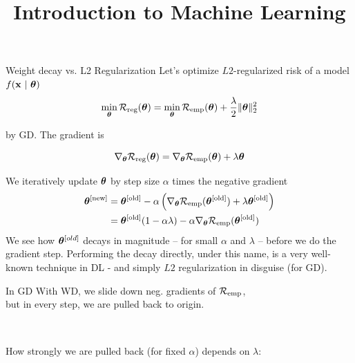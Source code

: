 \documentclass[11pt,compress,t,notes=noshow, xcolor=table]{beamer}
\title{Introduction to Machine Learning}
\begin{document}




\begin{vbframe}{Weight decay vs. L2 Regularization}
Let's optimize $L2$-regularized risk of a model $f(\mathbf{x} ~|~ \bm{\theta})$
\vspace{-0.2cm}
\[
\min_{\bm{\theta}} \mathcal{R}_{\text{reg}}(\bm{\theta}) = \min_{\bm{\theta}} \mathcal{R}_{\text{emp}}(\bm{\theta}) + \frac{\lambda}{2} \|\bm{\theta}\|^2_2
\]

by GD. The gradient is

\[
\nabla_{\bm{\theta}} \mathcal{R}_{\text{reg}}(\bm{\theta}) = \nabla_{\bm{\theta}} \mathcal{R}_{\text{emp}}(\bm{\theta}) + \lambda \bm{\theta}
\]

We iteratively update $\bm{\theta}$ by step size \(\alpha\) times the
negative gradient
\vspace{-0.2cm}
\begin{align*}
\bm{\theta}^{[\text{new}]} &= \bm{\theta}^{[\text{old}]} - \alpha \left(\nabla_{\bm{\theta}} \mathcal{R}_{\text{emp}}(\bm{\theta}^{[\text{old}]}) + \lambda \bm{\theta}^{[\text{old}]}\right) \\&=
\bm{\theta}^{[\text{old}]} (1 - \alpha \lambda) - \alpha \nabla_{\bm{\theta}} \mathcal{R}_{\text{emp}}(\bm{\theta}^{[\text{old}]})
\end{align*}
{\small
We see how $\bm{\theta}^{[old]}$ decays in magnitude -- for small $\alpha$ and $\lambda$ -- before we do the gradient step. Performing the decay directly, under this name, is a very well-known technique in DL - and simply $L2$ regularization in disguise (for GD).
}
\framebreak


In GD With WD, we slide down neg. gradients of $\mathcal{R}_{\text{emp}}$, \\
but in every step, we are pulled back to origin.
\begin{figure}
  \\
\end{figure}


\framebreak

How strongly we are pulled back (for fixed $\alpha$) depends on $\lambda$:


\end{vbframe}
\end{document}
